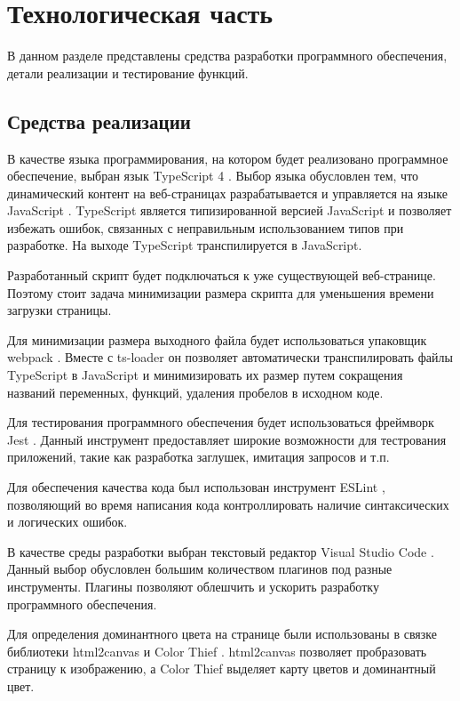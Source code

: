 \chapter{Технологическая часть}

В данном разделе представлены средства разработки программного обеспечения, детали реализации и тестирование функций.

\section{Средства реализации}

В качестве языка программирования, на котором будет реализовано программное обеспечение, выбран язык TypeScript 4 \cite{ts}. Выбор языка обусловлен тем, что динамический контент на веб-страницах разрабатывается и управляется на языке JavaScript \cite{js}. TypeScript является типизированной версией JavaScript и позволяет избежать ошибок, связанных с неправильным использованием типов при разработке. На выходе TypeScript транспилируется в JavaScript.

Разработанный скрипт будет подключаться к уже существующей веб-странице. Поэтому стоит задача минимизации размера скрипта для уменьшения времени загрузки страницы.

Для минимизации размера выходного файла будет использоваться упаковщик webpack \cite{webpack}. Вместе с ts-loader \cite{tsloader} он позволяет автоматически транспилировать файлы TypeScript в JavaScript и минимизировать их размер путем сокращения названий переменных, функций, удаления пробелов в исходном коде.

Для тестирования программного обеспечения будет использоваться фреймворк \cite{framework} Jest \cite{jest}. Данный инструмент предоставляет широкие возможности для тестрования приложений, такие как разработка заглушек, имитация запросов и т.п.

Для обеспечения качества кода был использован инструмент ESLint \cite{eslint}, позволяющий во время написания кода контроллировать наличие синтаксических и логических ошибок.

В качестве среды разработки выбран текстовый редактор Visual Studio Code \cite{vscode}. Данный выбор обусловлен большим количеством плагинов под разные инструменты. Плагины позволяют облешчить и ускорить разработку программного обеспечения.

Для определения доминантного цвета на странице были использованы в связке библиотеки html2canvas \cite{html2canvas} и Color Thief \cite{colorthief}. html2canvas позволяет пробразовать страницу к изображению, а Color Thief выделяет карту цветов и доминантный цвет.

